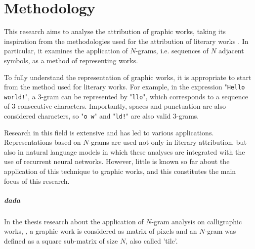 \chapter{Methodology}
\label{chap:methodology}
This research aims to analyse the attribution of graphic works, taking its inspiration from the methodologies used for the attribution of literary works \citep[see][]{thesis}. In particular, it examines the application of $N$-grams, i.e. sequences of $N$ adjacent symbols, as a method of representing works.

\noindent To fully understand the representation of graphic works, it is appropriate to start from the method used for literary works. For example, in the expression "\texttt{Hello world!}", a $3$-gram can be represented by "\texttt{llo}", which corresponds to a sequence of $3$ consecutive characters. Importantly, spaces and punctuation are also considered characters, so "\texttt{o w}" and "\texttt{ld!}" are also valid $3$-grams.

\noindent Research in this field is extensive and has led to various applications. Representations based on $N$-grams are used not only in literary attribution, but also in natural language models in which these analyses are integrated with the use of recurrent neural networks. However, little is known so far about the application of this technique to graphic works, and this constitutes the main focus of this research.

\paragraph{\gls{dada}}
In the thesis research about the application of $N$-gram analysis on calligraphic works, \citep[see][]{thesis}, a graphic work is considered as matrix of pixels and an $N$-gram was defined as a square sub-matrix of size $N$, also called 'tile'.

